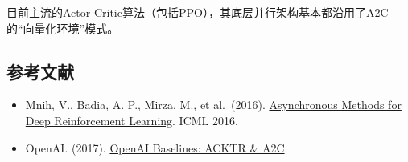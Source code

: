 目前主流的Actor-Critic算法（包括PPO），其底层并行架构基本都沿用了A2C的``向量化环境''模式。

\FloatBarrier
{}
\hypertarget{ux53c2ux8003ux6587ux732e-56}{%
\subsection{参考文献}\label{ux53c2ux8003ux6587ux732e-56}}

\vspace{0.25em}
\begin{itemize}
\tightlist
\item
  Mnih, V., Badia, A. P., Mirza, M., et al.~(2016). \href{https://arxiv.org/abs/1602.01783}{Asynchronous Methods for Deep Reinforcement Learning}. ICML 2016.
\item
  OpenAI. (2017). \href{https://openai.com/index/openai-baselines-acktr-a2c/}{OpenAI Baselines: ACKTR \& A2C}.
\end{itemize}

\clearpage
